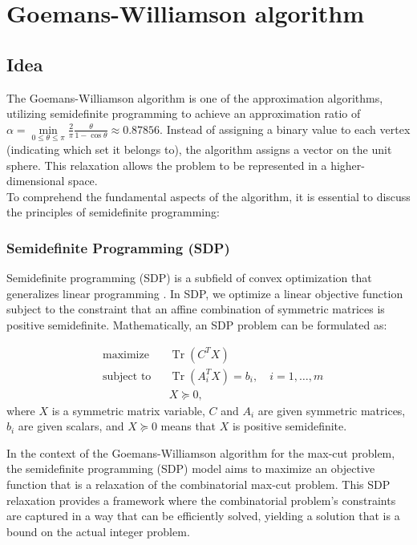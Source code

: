 \section{Goemans-Williamson algorithm}
\label{sec:goemanswilliamson}

    \subsection{Idea}
    
    The Goemans-Williamson algorithm is one of the approximation algorithms, utilizing semidefinite programming to achieve an approximation ratio of \(\alpha = \min\limits_{0 \leq \theta \leq \pi} \frac{2}{\pi} \frac{\theta}{1 - \cos \theta} \approx 0.87856\). Instead of assigning a binary value to each vertex (indicating which set it belongs to), the algorithm assigns a vector on the unit sphere. This relaxation allows the problem to be represented in a higher-dimensional space. \\

    \noindent
    To comprehend the fundamental aspects of the algorithm, it is essential to discuss the principles of semidefinite programming:

    \subsubsection{\textbf{Semidefinite Programming (SDP)}}

    Semidefinite programming (SDP) is a subfield of convex optimization that generalizes linear programming \cite{gartner2012semidefinite}. In SDP, we optimize a linear objective function subject to the constraint that an affine combination of symmetric matrices is positive semidefinite. Mathematically, an SDP problem can be formulated as:
    
    \[
    \begin{aligned}
    & \text{maximize} && \operatorname{Tr}(C^T X) \\
    & \text{subject to} && \operatorname{Tr}(A_i^T X) = b_i, \quad i = 1, \ldots, m \\
    & && X \succeq 0,
    \end{aligned}
    \]
    where \( X \) is a symmetric matrix variable, \( C \) and \( A_i \) are given symmetric matrices, \( b_i \) are given scalars, and \( X \succeq 0 \) means that \( X \) is positive semidefinite.
    
    In the context of the Goemans-Williamson algorithm for the max-cut problem, the semidefinite programming (SDP) model aims to maximize an objective function that is a relaxation of the combinatorial max-cut problem. This SDP relaxation provides a framework where the combinatorial problem's constraints are captured in a way that can be efficiently solved, yielding a solution that is a bound on the actual integer problem.
    
